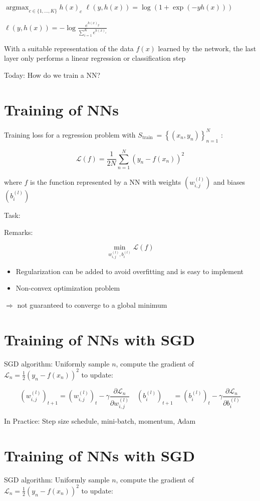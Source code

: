 $\operatorname{argmax}_{c \in\{1, \ldots, K\}} h(x)_{c}$ $\ell(y, h(x))=\log (1+\exp (-y h(x)))$

$\ell(y, h(x))=-\log \frac{e^{h(x)_{y}}}{\sum_{i=1}^{K} e^{h(x)_{i}}}$

With a suitable representation of the data $f(x)$ learned by the network, the last layer only performs a linear regression or classification step

Today: How do we train a NN?

\section*{Training of NNs}
Training loss for a regression problem with $S_{\text {train }}=\left\{\left(x_{n}, y_{n}\right)\right\}_{n=1}^{N}$ :

$$
\mathscr{L}(f)=\frac{1}{2 N} \sum_{n=1}^{N}\left(y_{n}-f\left(x_{n}\right)\right)^{2}
$$

where $f$ is the function represented by a NN with weights $\left(w_{i, j}^{(l)}\right)$ and biases $\left(b_{i}^{(l)}\right)$

Task:

Remarks:

$$
\min _{w_{i, j}^{(l)}, b_{i}^{(l)}} \mathscr{L}(f)
$$

\begin{itemize}
  \item Regularization can be added to avoid overfitting and is easy to implement
  \item Non-convex optimization problem
\end{itemize}

$\Rightarrow$ not guaranteed to converge to a global minimum

\section*{Training of NNs with SGD}
SGD algorithm: Uniformly sample $n$, compute the gradient of $\mathscr{L}_{n}=\frac{1}{2}\left(y_{n}-f\left(x_{n}\right)\right)^{2}$ to update:

$$
\left(w_{i, j}^{(l)}\right)_{t+1}=\left(w_{i, j}^{(l)}\right)_{t}-\gamma \frac{\partial \mathscr{L}_{n}}{\partial w_{i, j}^{(l)}} \quad\left(b_{i}^{(l)}\right)_{t+1}=\left(b_{i}^{(l)}\right)_{t}-\gamma \frac{\partial \mathscr{L}_{n}}{\partial b_{i}^{(l)}}
$$

In Practice: Step size schedule, mini-batch, momentum, Adam

\section*{Training of NNs with SGD}
SGD algorithm: Uniformly sample $n$, compute the gradient of $\mathscr{L}_{n}=\frac{1}{2}\left(y_{n}-f\left(x_{n}\right)\right)^{2}$ to update:

